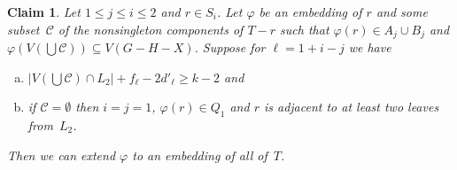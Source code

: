 \documentclass[12pt]{article}
\newtheorem{claim}[theorem]{Claim}
\begin{document}
\begin{claim}\label{extend}
  Let $1\le j\le i\le 2$ and $r\in S_i$. Let  $\varphi$ be   an embedding of $r$ and some  %
    subset~$\mathcal C$ of the 
    nonsingleton
    components of $T-r$ such that $\varphi (r)\in A_j\cup B_j$ and $\varphi (V(\bigcup\mathcal C))\subseteq V(G-H-X)$. Suppose for $\ell=1+i-j$ we have
   \begin{enumerate}[(a)]
   \item\label{weird}
       $|V(\bigcup\mathcal C)\cap L_2|+f_\ell-2 d'_{\ell}\ge k-2$ and
   \item\label{weird2}
     if $\mathcal C=\emptyset$ then $i=j=1$,  $\varphi(r)\in Q_1$ and $r$ is adjacent to at least two leaves from~$L_2$.
   \end{enumerate}
   Then we can extend $\varphi$ to an embedding of all of~$T$.
\end{claim}
\end{document}
